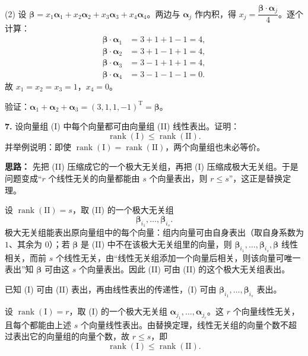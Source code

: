 (2) 设 $\boldsymbol{\beta}=x_1\boldsymbol{\alpha}_1+x_2\boldsymbol{\alpha}_2+x_3\boldsymbol{\alpha}_3+x_4\boldsymbol{\alpha}_4$。两边与 $\boldsymbol{\alpha}_j$ 作内积，得 $x_j=\dfrac{\boldsymbol{\beta}\cdot\boldsymbol{\alpha}_j}{4}$。逐个计算：
\[
\begin{aligned}
\boldsymbol{\beta}\cdot\boldsymbol{\alpha}_1&=3+1+1-1=4,\\
\boldsymbol{\beta}\cdot\boldsymbol{\alpha}_2&=3+1-1+1=4,\\
\boldsymbol{\beta}\cdot\boldsymbol{\alpha}_3&=3-1+1+1=4,\\
\boldsymbol{\beta}\cdot\boldsymbol{\alpha}_4&=3-1-1-1=0.
\end{aligned}
\]
故 $x_1=x_2=x_3=1$，$x_4=0$。

验证：$\boldsymbol{\alpha}_1+\boldsymbol{\alpha}_2+\boldsymbol{\alpha}_3=(3,1,1,-1)^\mathrm{T}=\boldsymbol{\beta}$。

\else \answerarea[10] \fi%

\textbf{7.} 设向量组 (I) 中每个向量都可由向量组 (II) 线性表出。证明：
\[
\operatorname{rank}(\mathrm{I})\leq \operatorname{rank}(\mathrm{II}).
\]
并举例说明：即使 $\operatorname{rank}(\mathrm{I})=\operatorname{rank}(\mathrm{II})$，两个向量组也未必等价。

\ifshowsolutions%
\quad
\textbf{思路：} 先把 (II) 压缩成它的一个极大无关组，再把 (I) 压缩成极大无关组。于是问题变成“$r$ 个线性无关的向量都能由 $s$ 个向量表出，则 $r\leq s$”，这正是替换定理。

设 $\operatorname{rank}(\mathrm{II})=s$，取 (II) 的一个极大无关组
\[
\boldsymbol{\beta}_{i_1},\ldots,\boldsymbol{\beta}_{i_s}.
\]
极大无关组能表出原向量组中的每个向量：组内向量可由自身表出（取自身系数为 $1$、其余为 $0$）；若 $\boldsymbol{\beta}$ 是 (II) 中不在该极大无关组里的向量，则 $\boldsymbol{\beta}_{i_1},\ldots,\boldsymbol{\beta}_{i_s},\boldsymbol{\beta}$ 线性相关，而前 $s$ 个线性无关，由“线性无关组添加一个向量后相关，则该向量可唯一表出”知 $\boldsymbol{\beta}$ 可由这 $s$ 个向量表出。因此 (II) 可由 (II) 的这个极大无关组表出。

已知 (I) 可由 (II) 表出，再由线性表出的传递性，(I) 可由 $\boldsymbol{\beta}_{i_1},\ldots,\boldsymbol{\beta}_{i_s}$ 表出。

设 $\operatorname{rank}(\mathrm{I})=r$，取 (I) 的一个极大无关组 $\boldsymbol{\alpha}_{j_1},\ldots,\boldsymbol{\alpha}_{j_r}$。这 $r$ 个向量线性无关，且每个都能由上述 $s$ 个向量线性表出。由替换定理，线性无关组的向量个数不超过表出它的向量组的向量个数，故 $r\leq s$，即
\[
\operatorname{rank}(\mathrm{I})\leq \operatorname{rank}(\mathrm{II}).
\]

